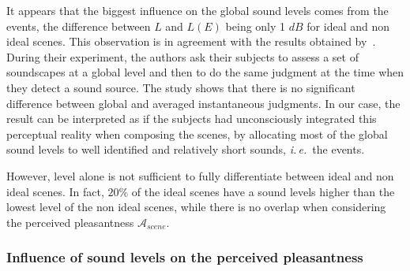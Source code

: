 \documentclass[12pt]{elsarticle}
\newcommand{\ie}{\emph{i.\,e.}}
\newcommand{\al}{\emph{et~al.}}
\begin{document}

It appears that the biggest influence on the global sound levels comes from the events, the difference between $L$ and $L(E)$ being only 1 $dB$ for ideal and non ideal scenes. This observation is in agreement with the results obtained by~\cite{kuwano_memory_2003}. During their experiment, the authors ask their subjects to assess a set of soundscapes at a global level and then to do the same judgment at the time when they detect a sound source. The study shows that there is no significant difference between global and averaged instantaneous judgments. In our case, the result can be interpreted as if the subjects had unconsciously integrated this perceptual reality when composing the scenes, by allocating most of the global sound levels to well identified and relatively short sounds, \ie~the events.


However, level alone is not sufficient to fully differentiate between ideal and non ideal scenes. In fact, $20\%$ of the ideal scenes have a sound levels higher than the lowest level of the non ideal scenes, while there is no overlap when considering the perceived pleasantness $\mathcal{A}_{scene}$.

\subsubsection*{Influence of sound levels on the perceived pleasantness}
\end{document}
